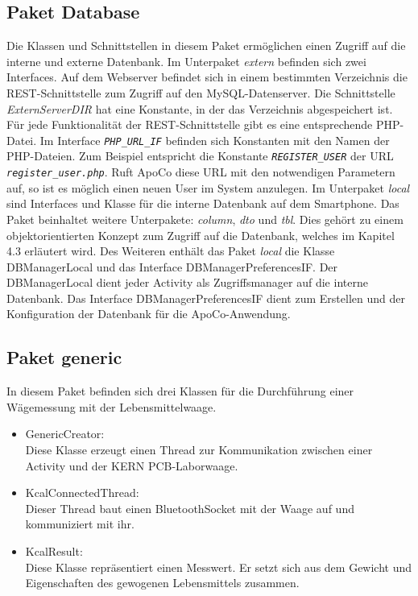 \subsection*{Paket Database}

Die Klassen und Schnittstellen in diesem Paket erm\"oglichen einen Zugriff auf die interne und externe Datenbank.
Im Unterpaket \emph{extern} befinden sich zwei Interfaces.
Auf dem Webserver befindet sich in einem bestimmten Verzeichnis die REST-Schnittstelle zum Zugriff auf den MySQL-Datenserver.
Die Schnittstelle \emph{ExternServerDIR} hat eine Konstante, in der das Verzeichnis abgespeichert ist.
F\"ur jede Funktionalit\"at der REST-Schnittstelle gibt es eine entsprechende PHP-Datei.
Im Interface \emph{\texttt{PHP\_URL\_IF}} befinden sich Konstanten mit den Namen der PHP-Dateien.
Zum Beispiel entspricht die Konstante \emph{\texttt{REGISTER\_USER}} der URL \emph{\texttt{register\_user.php}}.
Ruft ApoCo diese URL mit den notwendigen Parametern auf, so ist es m\"oglich einen neuen User im System anzulegen.
Im Unterpaket \emph{local} sind Interfaces und Klasse f\"ur die interne Datenbank auf dem Smartphone.
Das Paket beinhaltet weitere Unterpakete: \emph{column}, \emph{dto} und \emph{tbl}.
Dies geh\"ort zu einem objektorientierten Konzept zum Zugriff auf die Datenbank, welches im Kapitel 4.3 erl\"autert wird.
Des Weiteren enth\"alt das Paket \emph{local} die Klasse DBManagerLocal und das Interface DBManagerPreferencesIF.
Der DBManagerLocal dient jeder Activity als Zugriffsmanager auf die interne Datenbank.
Das Interface DBManagerPreferencesIF dient zum Erstellen und der Konfiguration der Datenbank f\"ur die ApoCo-Anwendung.\\

\subsection*{Paket generic}

In diesem Paket befinden sich drei Klassen f\"ur die Durchf\"uhrung einer W\"agemessung mit der Lebensmittelwaage.
\begin{itemize}
 \item GenericCreator:\\
 Diese Klasse erzeugt einen Thread zur Kommunikation zwischen einer Activity und der KERN PCB-Laborwaage.
 \item KcalConnectedThread:\\
 Dieser Thread baut einen BluetoothSocket mit der Waage auf und kommuniziert mit ihr.
 \item KcalResult:\\
 Diese Klasse repr\"asentiert einen Messwert.
 Er setzt sich aus dem Gewicht und Eigenschaften des gewogenen Lebensmittels zusammen.
 
\end{itemize}

